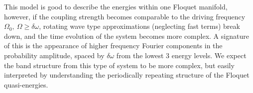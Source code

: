 This model is good to describe the energies within one Floquet manifold, however, if the coupling strength becomes comparable to the driving frequency $\Omega_0,\ \Omega\geq\delta\omega$, rotating wave type approximations (neglecting fast terms) break down, and the time evolution of the system becomes more complex. A signature of this is the appearance of higher frequency Fourier components in the probability amplitude, spaced by $\delta\omega$ from the lowest 3 energy levels. We expect the band structure from this type of system to be more complex, but easily interpreted by understanding the periodically repeating structure of the Floquet quasi-energies. 
 











